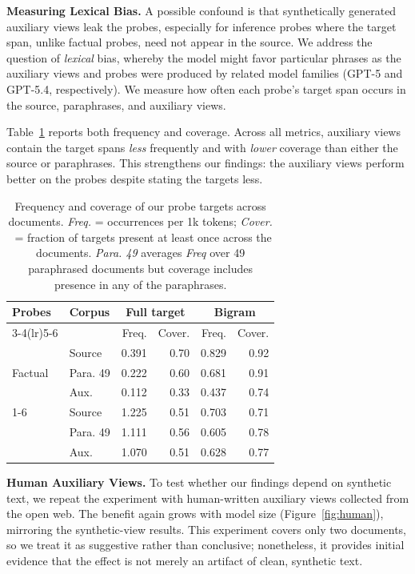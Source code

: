 \documentclass[11pt]{article}
\begin{document}
\textbf{Measuring Lexical Bias.} A possible confound is that synthetically generated auxiliary views leak the probes, especially for inference probes where the target span, unlike factual probes, need not appear in the source. We address the question of \textit{lexical} bias, whereby the model might favor particular phrases as the auxiliary views and probes were produced by related model families (GPT-5 and GPT-5.4, respectively). We measure how often each probe's target span occurs in the source, paraphrases, and auxiliary views.

Table~\ref{tab:target-occurrence-all} reports both frequency and coverage. Across all metrics, auxiliary views contain the target spans \textit{less} frequently and with \textit{lower} coverage than either the source or paraphrases. This strengthens our findings: the auxiliary views perform better on the probes despite stating the targets less.
\begin{table}[h]
\centering
\small
\setlength{\tabcolsep}{4pt}
\renewcommand{\arraystretch}{0.9}
\caption{Frequency and coverage of our probe targets across documents. \textit{Freq.} = occurrences per 1k tokens; \textit{Cover.} \ = fraction of targets present at least once across the documents. \textit{Para. 49} averages \textit{Freq} over 49 paraphrased documents but coverage includes presence in any of the paraphrases.}
\label{tab:target-occurrence-all}
\begin{tabular}{llrrrr}
\toprule
Probes & Corpus & \multicolumn{2}{c}{Full target} & \multicolumn{2}{c}{Bigram} \\
\cmidrule(lr){3-4}\cmidrule(lr){5-6}
 & & Freq. & Cover. & Freq. & Cover. \\
\midrule
\multirow{3}{*}{Factual} & Source & 0.391 & 0.70 & 0.829 & 0.92 \\
 & Para. 49 & 0.222 & 0.60 & 0.681 & 0.91 \\
 & Aux. & 0.112 & 0.33 & 0.437 & 0.74 \\
\cmidrule(lr){1-6}
\multirow{3}{*}{Inference} & Source & 1.225 & 0.51 & 0.703 & 0.71 \\
 & Para. 49 & 1.111 & 0.56 & 0.605 & 0.78 \\
 & Aux. & 1.070 & 0.51 & 0.628 & 0.77 \\
\bottomrule
\end{tabular}
\end{table}

\textbf{Human Auxiliary Views.} To test whether our findings depend on synthetic text, we repeat the experiment with human-written auxiliary views collected from the open web. The benefit again grows with model size (Figure~\ref{fig:human}), mirroring the synthetic-view results. This experiment covers only two documents, so we treat it as suggestive rather than conclusive; nonetheless, it provides  initial evidence that the effect is not merely an artifact of clean, synthetic text.
\end{document}

